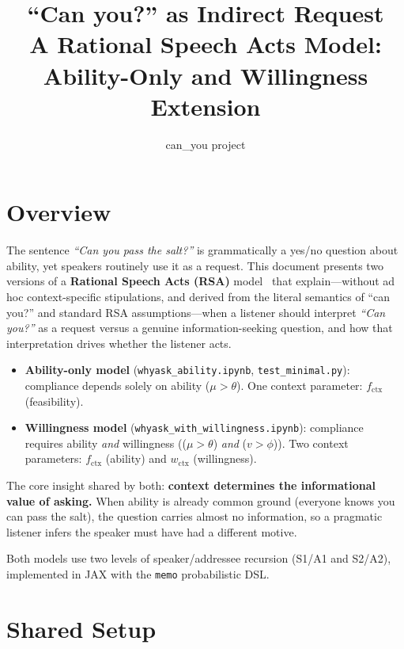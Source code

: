 \documentclass[11pt]{article}
\title{\textbf{``Can you?'' as Indirect Request}\\[4pt]
\large A Rational Speech Acts Model: Ability-Only and Willingness Extension}
\author{can\_you project}
\date{}
\begin{document}
\maketitle
\tableofcontents
\bigskip

\section{Overview}

The sentence \emph{``Can you pass the salt?''} is grammatically a yes/no question
about ability, yet speakers routinely use it as a request. This document presents
two versions of a \textbf{Rational Speech Acts (RSA)} model~\cite{frank2012predicting,goodman2016pragmatic}
that explain---without ad hoc context-specific stipulations, and derived from
the literal semantics of ``can you?'' and standard RSA assumptions---when a
listener should interpret \emph{``Can you?''} as a request versus a genuine
information-seeking question, and how that interpretation drives whether the
listener acts.

\begin{itemize}
  \item \textbf{Ability-only model} (\texttt{whyask\_ability.ipynb},
        \texttt{test\_minimal.py}): compliance depends solely on ability
        ($\mu > \theta$). One context parameter: $f_{\text{ctx}}$ (feasibility).
  \item \textbf{Willingness model} (\texttt{whyask\_with\_willingness.ipynb}):
        compliance requires ability \emph{and} willingness
        (($\mu > \theta$) \emph{and} ($v > \phi$)). Two context parameters:
        $f_{\text{ctx}}$ (ability) and $w_{\text{ctx}}$ (willingness).
\end{itemize}

The core insight shared by both: \textbf{context determines the informational
value of asking.} When ability is already common ground (everyone knows you can
pass the salt), the question carries almost no information, so a pragmatic
listener infers the speaker must have had a different motive.

Both models use two levels of speaker/addressee recursion (S1/A1 and S2/A2),
implemented in JAX with the \texttt{memo} probabilistic DSL.

\section{Shared Setup}
\end{document}
